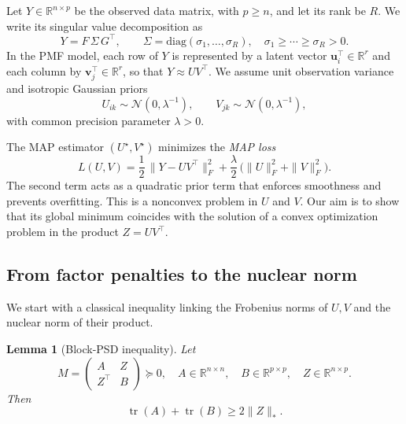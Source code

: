 \documentclass[11pt]{article}
\theoremstyle{spaced}
\newtheorem{lemma}{Lemma}
\begin{document}
Let \(Y \in \mathbb{R}^{n \times p}\) be the observed data matrix, with \(p \ge n\), and let its rank be \(R\).  
We write its singular value decomposition as
\[
Y = F\,\Sigma\,G^\top,
\qquad
\Sigma = \mathrm{diag}(\sigma_1, \ldots, \sigma_R),
\quad
\sigma_1 \ge \cdots \ge \sigma_R > 0.
\]
In the PMF model, each row of \(Y\) is represented by a latent vector \(\mathbf{u}_i^\top \in \mathbb{R}^r\) and each column by \(\mathbf{v}_j^\top \in \mathbb{R}^r\), so that \(Y \approx UV^\top\).
We assume unit observation variance and isotropic Gaussian priors
\[
U_{ik} \sim \mathcal{N}(0, \lambda^{-1}),
\qquad
V_{jk} \sim \mathcal{N}(0, \lambda^{-1}),
\]
with common precision parameter \(\lambda > 0\).

The MAP estimator \((U^\star, V^\star)\) minimizes the \textit{MAP loss}
\begin{equation}
L(U,V)
= \frac{1}{2}\,\|Y - UV^\top\|_F^2
  + \frac{\lambda}{2}\,\big(\|U\|_F^2 + \|V\|_F^2\big).
\label{eq:map-loss}
\end{equation}
The second term acts as a quadratic prior term that enforces smoothness and prevents overfitting.
This is a nonconvex problem in \(U\) and \(V\).
Our aim is to show that its global minimum coincides with the solution of a convex optimization problem in the product \(Z = UV^\top\).

\subsection*{From factor penalties to the nuclear norm}

We start with a classical inequality linking the Frobenius norms of \(U,V\) and the nuclear norm of their product.

\begin{lemma}[Block-PSD inequality]
Let
\[
M = \begin{pmatrix} A & Z \\ Z^\top & B \end{pmatrix} \succeq 0,
\quad
A \in \mathbb{R}^{n \times n},
\quad
B \in \mathbb{R}^{p \times p},
\quad
Z \in \mathbb{R}^{n \times p}.
\]
Then
\[
\operatorname{tr}(A) + \operatorname{tr}(B) \ge 2\|Z\|_*.
\]
\end{lemma}
\end{document}
